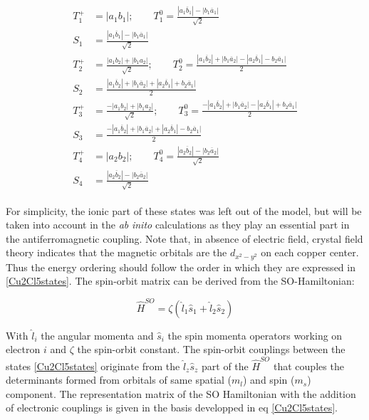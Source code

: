 \documentclass[10pt]{report}
\numberwithin{equation}{section}
\begin{document}
\begin{align}\label{Cu2Cl5states}
    \begin{split}
    T_1^+&=|a_1b_1| ; \qquad T_1^0= \frac{|a_1 \overline{b}_1|-|b_1\overline{a}_1|}{\sqrt{2}}\\
    S_1&=\frac{|a_1 \overline{b}_1|-|b_1\overline{a}_1|}{\sqrt{2}}\\
    T_2^+&=\frac{|a_1b_2|+|b_1a_2|}{\sqrt{2}} ;\qquad T_2^0=\frac{|a_1\overline{b}_2|+|b_1\overline{a}_2|-|a_2\overline{b}_1|-b_2\overline{a}_1|}{2}\\
    S_2&=\frac{|a_1\overline{b}_2|+|b_1\overline{a}_2|+|a_2\overline{b}_1|+b_2\overline{a}_1|}{2}\\
    T_3^+&=\frac{-|a_1b_2|+|b_1a_2|}{\sqrt{2}} ;\qquad T_3^0=\frac{-|a_1\overline{b}_2|+|b_1\overline{a}_2|-|a_2\overline{b}_1|+b_2\overline{a}_1|}{2}\\
    S_3&=\frac{-|a_1\overline{b}_2|+|b_1\overline{a}_2|+|a_2\overline{b}_1|-b_2\overline{a}_1|}{2}\\
    T_4^+&=|a_2b_2| ; \qquad T_4^0= \frac{|a_2 \overline{b}_2|-|b_2\overline{a}_2|}{\sqrt{2}}\\
    S_4&=\frac{|a_2 \overline{b}_2|-|b_2\overline{a}_2|}{\sqrt{2}} 
    \end{split}
\end{align}

For simplicity, the ionic part of these states was left out of the model, but will be taken into account in the \textit{ab} \textit{inito} calculations as they play an essential part in the antiferromagnetic coupling.
Note that, in absence of electric field, crystal field theory indicates that the magnetic orbitals are the $d_{x^2-y^2}$ on each copper center. Thus the energy ordering should follow the order in which they are expressed in \ref{Cu2Cl5states}.
The spin-orbit matrix can be derived from the SO-Hamiltonian:

\begin{equation}
    \hat{H}^{SO}=\zeta (\hat{l}_1 \hat{s}_1 +\hat{l}_2\hat{s}_2)
\end{equation}

With $\hat{l}_i$ the angular momenta and $\hat{s}_i$ the spin momenta operators working on electron $i$ and $\zeta$ the spin-orbit constant.
The spin-orbit couplings between the states \ref{Cu2Cl5states} originate from the $\hat{l}_z\hat{s}_z$ part of the $\hat{H}^{SO}$ that couples the determinants formed from orbitals of same spatial ($m_l$) and spin ($m_s$) component.
The representation matrix of the SO Hamiltonian with the addition of electronic couplings is given in the basis developped in eq \ref{Cu2Cl5states}.
\end{document}
